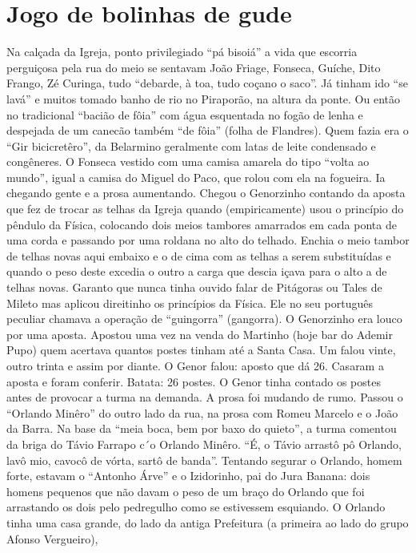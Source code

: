 \documentclass[12pt,brazil,]{book}
\begin{document}
\section{Jogo de bolinhas de gude}\label{jogo-de-bolinhas-de-gude}

Na calçada da Igreja, ponto privilegiado ``pá bisoiá'' a vida que
escorria perguiçosa pela rua do meio se sentavam João Friage, Fonseca,
Guíche, Dito Frango, Zé Curinga, tudo ``debarde, à toa, tudo coçano o
saco''. Já tinham ido ``se lavá'' e muitos tomado banho de rio no
Piraporão, na altura da ponte. Ou então no tradicional ``bacião de
fôia'' com água esquentada no fogão de lenha e despejada de um canecão
também ``de fôia'' (folha de Flandres). Quem fazia era o ``Gir
bicicretêro'', da Belarmino geralmente com latas de leite condensado e
congêneres. O Fonseca vestido com uma camisa amarela do tipo ``volta ao
mundo'', igual a camisa do Miguel do Paco, que rolou com ela na
fogueira. Ia chegando gente e a prosa aumentando. Chegou o Genorzinho
contando da aposta que fez de trocar as telhas da Igreja quando
(empiricamente) usou o princípio do pêndulo da Física, colocando dois
meios tambores amarrados em cada ponta de uma corda e passando por uma
roldana no alto do telhado. Enchia o meio tambor de telhas novas aqui
embaixo e o de cima com as telhas a serem substituídas e quando o peso
deste excedia o outro a carga que descia içava para o alto a de telhas
novas. Garanto que nunca tinha ouvido falar de Pitágoras ou Tales de
Mileto mas aplicou direitinho os princípios da Física. Ele no seu
português peculiar chamava a operação de ``guingorra'' (gangorra). O
Genorzinho era louco por uma aposta. Apostou uma vez na venda do
Martinho (hoje bar do Ademir Pupo) quem acertava quantos postes tinham
até a Santa Casa. Um falou vinte, outro trinta e assim por diante. O
Genor falou: aposto que dá 26. Casaram a aposta e foram conferir.
Batata: 26 postes. O Genor tinha contado os postes antes de provocar a
turma na demanda. A prosa foi mudando de rumo. Passou o ``Orlando
Minêro'' do outro lado da rua, na prosa com Romeu Marcelo e o João da
Barra. Na base da ``meia boca, bem por baxo do quieto'', a turma
comentou da briga do Távio Farrapo c´o Orlando Minêro. ``É, o Távio
arrastô pô Orlando, lavô mio, cavocô de vórta, sartô de banda''.
Tentando segurar o Orlando, homem forte, estavam o ``Antonho Árve'' e o
Izidorinho, pai do Jura Banana: dois homens pequenos que não davam o
peso de um braço do Orlando que foi arrastando os dois pelo pedregulho
como se estivessem esquiando. O Orlando tinha uma casa grande, do lado
da antiga Prefeitura (a primeira ao lado do grupo Afonso Vergueiro),
\end{document}
